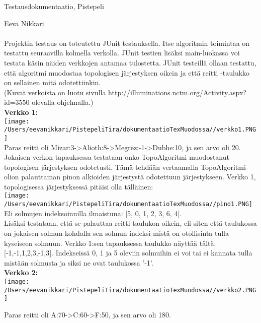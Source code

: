 \documentclass[12pt,a4paper,leqno]{amsart}
\begin{document}
Testausdokumentaatio, Pistepeli

Eeva Nikkari\\\\

Projektin testaus on toteutettu JUnit testauksella. Itse algoritmin toimintaa on testattu seuraavilla kolmella verkolla. JUnit testien lisäksi main-luokassa voi testata käsin näiden verkkojen antamaa tulostetta. JUnit testeillä ollaan testattu, että algoritmi muodostaa topologisen järjestyksen oikein ja että reitti -taulukko on sellainen mitä odotettiinkin.\\
(Kuvat verkoista on luotu sivulla http://illuminations.nctm.org/Activity.aspx?id=3550 olevalla ohjelmalla.)
\\

\textbf{Verkko 1:}\\
\texttt{[image: /Users/eevanikkari/PistepeliTira/dokumentaatioTexMuodossa//verkko1.PNG]}\\
Paras reitti oli Mizar:3->Alioth:8->Megrez:-1->Dubhe:10, ja sen arvo oli 20.\\

Jokaisen verkon tapauksessa testataan onko TopoAlgoritmi muodostanut topologisen järjestyksen odotetusti. Tämä tehdään vertaamalla TopoAlgoritmi-olion palauttaman pinon alkioiden järjestystä odotettuun järjestykseen. Verkko 1, topologisessa järjestyksessä pitäisi olla tälläinen:\\
\texttt{[image: /Users/eevanikkari/PistepeliTira/dokumentaatioTexMuodossa//pino1.PNG]}\\
Eli solmujen indeksoinnilla ilmaistuna: [5, 0, 1, 2, 3, 6, 4].\\

Lisäksi testataan, että se palauttaa reitti-taulukon oikein, eli siten että taulukossa on jokaisen solmun kohdalla sen solmun indeksi mistä on otollisinta tulla kyseiseen solmuun. Verkko 1:sen tapauksessa taulukko näyttää tältä: [-1,-1,1,2,3,-1,3]. Indekseissä 0, 1 ja 5 oleviin solmuihin ei voi tai ei kannata tulla mistään solmusta ja siksi ne ovat taulukossa '-1'.\\

\textbf{Verkko 2:}\\
\texttt{[image: /Users/eevanikkari/PistepeliTira/dokumentaatioTexMuodossa//verkko2.PNG]}

Paras reitti oli A:70->C:60->F:50, ja sen arvo oli 180.\\
\end{document}
